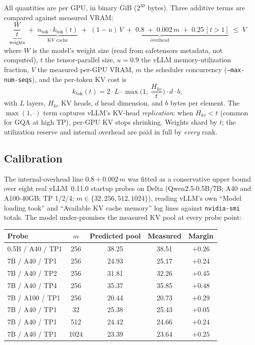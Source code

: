 \documentclass[11pt]{article}
\newcommand{\code}[1]{\texttt{#1}}
\begin{document}
All quantities are per GPU, in binary GiB ($2^{30}$ bytes). Three additive
terms are compared against measured VRAM:
\begin{equation}
\underbrace{\frac{W}{t}}_{\text{weights}}
\;+\;
\underbrace{n_{\text{tok}} \cdot k_{\text{tok}}(t)}_{\text{KV cache}}
\;+\;
\underbrace{(1-u)\,V \;+\; 0.8 \;+\; 0.002\,m \;+\; 0.25\,[t>1]}_{\text{overhead}}
\;\le\; V
\end{equation}
where $W$ is the model's weight size (read from safetensors metadata, not
computed), $t$ the tensor-parallel size, $u=0.9$ the vLLM memory-utilization
fraction, $V$ the measured per-GPU VRAM, $m$ the scheduler concurrency
(\code{--max-num-seqs}), and the per-token KV cost is
\begin{equation}
k_{\text{tok}}(t) = 2 \cdot L \cdot \max\!\Big(1,\ \frac{H_{kv}}{t}\Big) \cdot d \cdot b,
\end{equation}
with $L$ layers, $H_{kv}$ KV heads, $d$ head dimension, and $b$ bytes per
element. The $\max(1,\cdot)$ term captures vLLM's KV-head \emph{replication}:
when $H_{kv} < t$ (common for GQA at high TP), per-GPU KV stops shrinking.
Weights shard by $t$; the utilization reserve and internal overhead are paid in
full by \emph{every} rank.

\subsection{Calibration}

The internal-overhead line $0.8 + 0.002\,m$ was fitted as a conservative upper
bound over eight real vLLM~0.11.0 startup probes on Delta (Qwen2.5-0.5B/7B;
A40 and A100-40GB; TP 1/2/4; $m \in \{32,256,512,1024\}$), reading vLLM's own
``Model loading took'' and ``Available KV cache memory'' log lines against
\code{nvidia-smi} totals. The model under-promises the measured KV pool at
every probe point:

\begin{center}
\begin{tabular}{lcccc}
\toprule
Probe & $m$ & Predicted pool & Measured & Margin \\
\midrule
0.5B / A40 / TP1 & 256 & 38.25 & 38.51 & $+0.26$ \\
7B / A40 / TP1 & 256 & 24.93 & 25.17 & $+0.24$ \\
7B / A40 / TP2 & 256 & 31.81 & 32.26 & $+0.45$ \\
7B / A40 / TP4 & 256 & 35.37 & 35.85 & $+0.48$ \\
7B / A100 / TP1 & 256 & 20.44 & 20.73 & $+0.29$ \\
7B / A40 / TP1 & 32 & 25.38 & 25.43 & $+0.05$ \\
7B / A40 / TP1 & 512 & 24.42 & 24.66 & $+0.24$ \\
7B / A40 / TP1 & 1024 & 23.39 & 23.64 & $+0.25$ \\
\bottomrule
\end{tabular}
\end{center}
\end{document}

